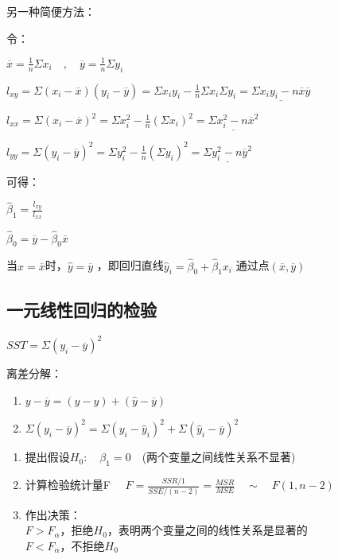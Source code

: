 \documentclass[UTF8,10pt]{book}
\begin{document}
{另一种简便方法：

令：

\(  \overline{x}=\frac{1}{n}\Sigma x_i   \quad , \quad \overline{y}=\frac{1}{n}\Sigma y_i \)

\(  l_{xy} = \Sigma(x_i-\overline{x})(y_i-\overline{y}) = \Sigma x_i y_i - \frac{1}{n}\Sigma x_i \Sigma y_i = \underline{\Sigma x_i y_i - n\overline{x}\overline{y} }  \)

\(  l_{xx} = \Sigma (x_i - \overline{x})^2 = \Sigma x_i^2 - \frac{1}{n}(\Sigma x_i)^2  =  \underline{\Sigma x_i^2 - n \overline{x}^2} \)

\(  l_{yy} = \Sigma (y_i - \overline{y})^2 = \Sigma y_i^2 - \frac{1}{n}(\Sigma y_i)^2   =  \underline{\Sigma y_i^2 - n \overline{y}^2} \)

可得：

\(  \hat{\beta}_1 = \frac{l_{xy}} { l_{xx}}  \)

\(  \hat{\beta}_0 = \overline{y} - \hat{\beta}_0 \overline{x}  \)

当\(x=\overline{x}\)时，\(\hat{y}=\overline{y}\)
，即回归直线\(\hat{y}_i=\hat{\beta}_0+\hat{\beta}_1 x_i\)
通过点\((\overline{x},\overline{y})\)

\subsection{一元线性回归的检验}\label{header-n104}

\(SST = \Sigma(y_i - \overline{y})^2\)

离差分解：

\begin{enumerate}
	\def\labelenumi{\arabic{enumi}.}
	\item
	\(   y-\overline{y} = (y-\hat{y})+(\hat{y}-\overline{y})   \) 
	\item
	\(   \Sigma (y_i-\overline{y})^2 =  \Sigma (y_i-\hat{y}_i)^2+\Sigma(\hat{y}_i-\overline{y})^2        \)
\end{enumerate}

\begin{enumerate}
	\def\labelenumi{\arabic{enumi}.}
	\item
	提出假设\(H_0 :\quad \beta_1 = 0 \quad\)(两个变量之间线性关系不显著)
	\item
	计算检验统计量F
	\(\quad F = \frac{SSR/1}{SSE/(n-2)} =\frac{MSR}{MSE} \quad \sim \quad F(1,n-2) \)
	\item
	作出决策：\\
	\(F>F_{\alpha}\)，拒绝\(H_0\)，表明两个变量之间的线性关系是显著的\\
	\(F<F_{\alpha}\)，不拒绝\(H_0\)
\end{enumerate}

}
\end{document}
